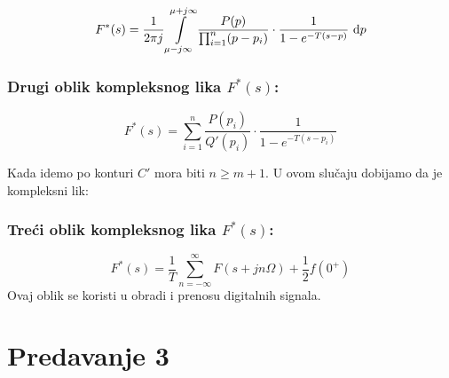 \documentclass{article}
\newcommand{\suma}{\sum\limits}
\newenvironment{defquote}
	{\begin{center}\begin{minipage}{0.9\linewidth}\begin{mdframed}[linewidth=1.2pt]}
		{\end{mdframed}\end{minipage}\end{center}}
\begin{document}
	$$F^*(s) = \frac{1}{2\pi j} \int\limits_{\mu-j\infty}^{\mu+j\infty} \dfrac{P(p)}{\prod_{i=1}^n(p-p_i)} \cdot \frac{1}{1-e^{-T(s-p)}}\ \text dp$$
	\begin{defquote}
		\subsubsection*{Drugi oblik kompleksnog lika $F^*(s)$:}
		$$F^*(s) = \suma_{i=1}^n \frac{P(p_i)}{Q'(p_i)} \cdot \frac{1}{1-e^{-T(s-p_i)}}$$
	\end{defquote}
	Kada idemo po konturi $C'$ mora biti $n\ge m+1$. U ovom slučaju dobijamo da je kompleksni lik:
	\begin{defquote}
		\subsubsection*{Treći oblik kompleksnog lika $F^*(s)$:}
		$$F^*(s) = \frac{1}{T} \suma_{n=-\infty}^\infty F(s+jn\Omega) + \frac{1}{2}f(0^+)$$
		Ovaj oblik se koristi u obradi i prenosu digitalnih signala.
	\end{defquote}
	
	\section*{Predavanje 3}
\end{document}
